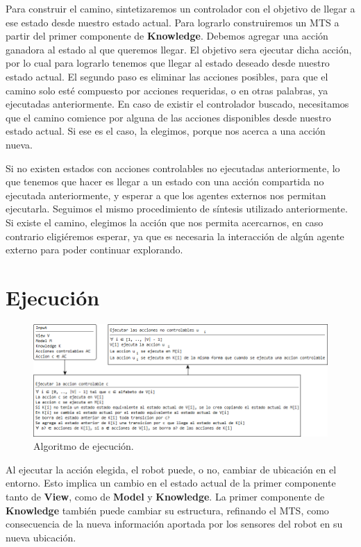 \vspace{\baselineskip}
Para construir el camino, sintetizaremos un controlador con el objetivo de llegar a ese estado desde nuestro estado actual. Para lograrlo construiremos un MTS
a partir del primer componente de \textbf{Knowledge}. Debemos agregar una acción ganadora al estado al que queremos llegar. El objetivo sera ejecutar dicha acción,
por lo cual para lograrlo tenemos que llegar al estado deseado desde nuestro estado actual. El segundo paso es eliminar las acciones posibles, para que el camino
solo esté compuesto por acciones requeridas, o en otras palabras, ya ejecutadas anteriormente. En caso de existir el controlador buscado, necesitamos que el camino
comience por alguna de las acciones disponibles desde nuestro estado actual. Si ese es el caso, la elegimos, porque nos acerca a una acción nueva.

\vspace{\baselineskip}
Si no existen estados con acciones controlables no ejecutadas anteriormente, lo que tenemos que hacer es llegar a un estado con una acción compartida no ejecutada
anteriormente, y esperar a que los agentes externos nos permitan ejecutarla. Seguimos el mismo procedimiento de síntesis utilizado anteriormente. Si existe el camino,
elegimos la acción que nos permita acercarnos, en caso contrario eligiéremos esperar, ya que es necesaria la interacción de algún agente externo para poder continuar
explorando.

\section{Ejecución}

\begin{figure}[H]
  \centering
    \includegraphics[width=1.0\textwidth]{Imagenes/Algoritmo/Algoritmo_ejecutar.png}
  \caption{Algoritmo de ejecución.}
  \label{fig:Algoritmo_ejecutar}
\end{figure}

Al ejecutar la acción elegida, el robot puede, o no, cambiar de ubicación en el entorno. Esto implica un cambio en el estado actual de la primer componente tanto 
de \textbf{View}, como de \textbf{Model} y \textbf{Knowledge}. La primer componente de \textbf{Knowledge} también puede cambiar su estructura, refinando el MTS,
como consecuencia de la nueva información aportada por los sensores del robot en su nueva ubicación.

